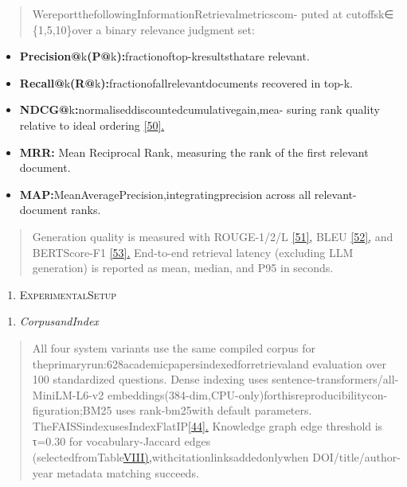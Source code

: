 \documentclass[
]{article}
\begin{document}
\begin{quote}
WereportthefollowingInformationRetrievalmetricscom- puted at cutoffsk∈ \{1,5,10\}over a binary relevance judgment set:
\end{quote}

\begin{itemize}
\item
  \textbf{Precision@}k\textbf{(P@}k\textbf{):}fractionoftop-kresultsthatare relevant.
\item
  \textbf{Recall@}k\textbf{(R@}k\textbf{):}fractionofallrelevantdocuments recovered in top-k.
\item
  \textbf{NDCG@}k\textbf{:}normaliseddiscountedcumulativegain,mea- suring rank quality relative to ideal ordering \hyperref[_bookmark58]{{[}50{]}.}
\item
  \textbf{MRR:} Mean Reciprocal Rank, measuring the rank of the first relevant document.
\item
  \textbf{MAP:}MeanAveragePrecision,integratingprecision across all relevant-document ranks.
\end{itemize}

\begin{quote}
Generation quality is measured with ROUGE-1/2/L \hyperref[_bookmark59]{{[}51{]},} BLEU \hyperref[_bookmark60]{{[}52{]},} and BERTScore-F1 \hyperref[_bookmark61]{{[}53{]}.} End-to-end retrieval latency (excluding LLM generation) is reported as mean, median, and P95 in seconds.
\end{quote}

\begin{enumerate}
\def\labelenumi{\Roman{enumi}.}
\setcounter{enumi}{4}
\item
  \protect{}\label{Experimental_Setup}{}\textsc{ExperimentalSetup}
\end{enumerate}

\begin{enumerate}
\def\labelenumi{\Alph{enumi}.}
\item
  \emph{CorpusandIndex}
\end{enumerate}

\begin{quote}
All four system variants use the same compiled corpus for theprimaryrun:628academicpapersindexedforretrievaland evaluation over 100 standardized questions. Dense indexing uses sentence-transformers/all-MiniLM-L6-v2 embeddings(384-dim,CPU-only)forthisreproducibilitycon- figuration;BM25 uses rank-bm25with default parameters. TheFAISSindexusesIndexFlatIP\hyperref[_bookmark52]{{[}44{]}.} Knowledge graph edge threshold is τ=0.30 for vocabulary-Jaccard edges (selectedfromTable\hyperref[_bookmark18]{VIII),}withcitationlinksaddedonlywhen DOI/title/author-year metadata matching succeeds.
\end{quote}
\end{document}
